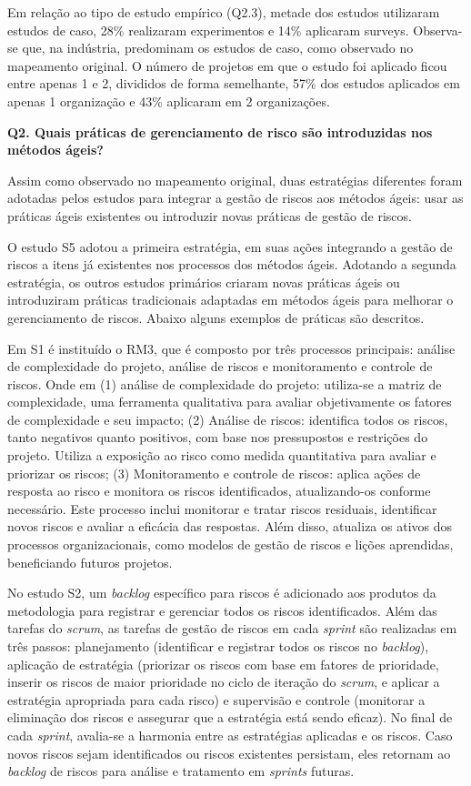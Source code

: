 \documentclass[
	12pt,
	openright,
	twoside,
	a4paper,
	english,
	brazil
	]{abntex2}
\begin{document}
Em relação ao tipo de estudo empírico (Q2.3), metade dos estudos utilizaram estudos de caso, 28\% realizaram experimentos e 14\% aplicaram surveys. Observa-se que, na indústria, predominam os estudos de caso, como observado no mapeamento original.
O número de projetos em que o estudo foi aplicado ficou entre apenas 1 e 2, divididos de forma semelhante, 57\% dos estudos aplicados em apenas 1 organização e 43\% aplicaram em 2 organizações.

\textbf{Q2. Quais práticas de gerenciamento de risco são introduzidas nos métodos ágeis?}

Assim como observado no mapeamento original, duas estratégias diferentes foram adotadas pelos estudos para integrar a gestão de riscos aos métodos ágeis: usar as práticas ágeis existentes ou introduzir novas práticas de gestão de riscos.

O estudo S5 adotou a primeira estratégia, em suas ações integrando a gestão de riscos a itens já existentes nos processos dos métodos ágeis. Adotando a segunda estratégia, os outros estudos primários criaram novas práticas ágeis ou introduziram práticas tradicionais adaptadas em métodos ágeis para melhorar o gerenciamento de riscos. Abaixo alguns exemplos de práticas são descritos.

Em S1 é instituído o RM3, que é composto por três processos principais: análise de complexidade do projeto, análise de riscos e monitoramento e controle de riscos. Onde em (1) análise de complexidade do projeto: utiliza-se a matriz de complexidade, uma ferramenta qualitativa para avaliar objetivamente os fatores de complexidade e seu impacto; (2) Análise de riscos: identifica todos os riscos, tanto negativos quanto positivos, com base nos pressupostos e restrições do projeto. Utiliza a exposição ao risco como medida quantitativa para avaliar e priorizar os riscos; (3) Monitoramento e controle de riscos: aplica ações de resposta ao risco e monitora os riscos identificados, atualizando-os conforme necessário. Este processo inclui monitorar e tratar riscos residuais, identificar novos riscos e avaliar a eficácia das respostas. Além disso, atualiza os ativos dos processos organizacionais, como modelos de gestão de riscos e lições aprendidas, beneficiando futuros projetos.

No estudo S2, um \textit{backlog} específico para riscos é adicionado aos produtos da metodologia para registrar e gerenciar todos os riscos identificados. Além das tarefas do \textit{scrum}, as tarefas de gestão de riscos em cada \textit{sprint} são realizadas em três passos: planejamento (identificar e registrar todos os riscos no \textit{backlog}), aplicação de estratégia (priorizar os riscos com base em fatores de prioridade, inserir os riscos de maior prioridade no ciclo de iteração do \textit{scrum}, e aplicar a estratégia apropriada para cada risco) e supervisão e controle (monitorar a eliminação dos riscos e assegurar que a estratégia está sendo eficaz). No final de cada \textit{sprint}, avalia-se a harmonia entre as estratégias aplicadas e os riscos. Caso novos riscos sejam identificados ou riscos existentes persistam, eles retornam ao \textit{backlog} de riscos para análise e tratamento em \textit{sprints} futuras.
\end{document}
